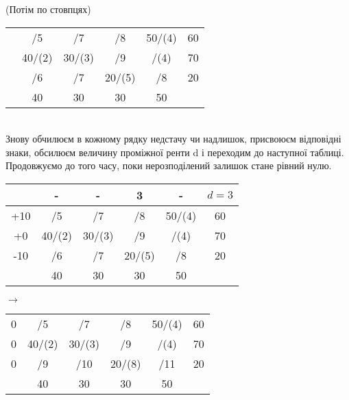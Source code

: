 \documentclass[12pt]{book}
\begin{document}
(Потім по стовпцях)
\begin{tabular}{ | c | c | c | c | c | c | }
\hline
	&		&		&		&		&\\
\hline
	&	/5	&	/7	&	/8	&	50/(4)	&	60\\
\hline
	&	40/(2)	&	30/(3)	&	/9	&	/(4)	&	70\\
\hline
	&	/6	&	/7	&	20/(5)	&	/8	&	20\\
\hline
	&	40	&	30	&	30	&	50	&\\
\hline
\end{tabular}\\
Знову обчилюєм в кожному рядку недстачу чи надлишок, присвоюєм відповідні знаки, обсилюєм величину проміжної ренти d і переходим до наступної таблиці. Продовжуємо до того часу, поки нерозподілений залишок стане рівний нулю.\\
\begin{tabular}{ | c | c | c | c | c | c | }
\hline
	&	-	&	-	&	3	&	-	&	$d=3$\\
\hline
+10	&	/5	&	/7	&	/8	&	50/(4)	&	60\\
\hline
+0	&	40/(2)	&	30/(3)	&	/9	&	/(4)	&	70\\
\hline
-10	&	/6	&	/7	&	20/(5)	&	/8	&	20\\
\hline
	&	40	&	30	&	30	&	50	&\\
\hline
\end{tabular}
$\rightarrow$
\begin{tabular}{ | c | c | c | c | c | c | }
\hline
	&		&		&		&		&\\
\hline
0	&	/5	&	/7	&	/8	&	50/(4)	&	60\\
\hline
0	&	40/(2)	&	30/(3)	&	/9	&	/(4)	&	70\\
\hline
0	&	/9	&	/10	&	20/(8)	&	/11	&	20\\
\hline
	&	40	&	30	&	30	&	50	&\\
\hline
\end{tabular}\\
\end{document}

